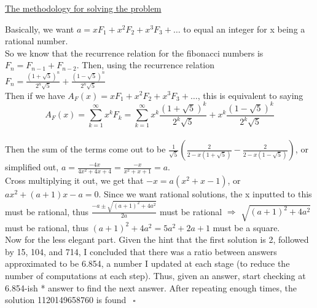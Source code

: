 \documentclass [12pt] {article}
\newcommand{\ud}{\underline}
\newcommand{\Rarr}{\Rightarrow}
\begin{document}
\ud{The methodology for solving the problem}

Basically, we want $a = xF_1+x^2F_2 + x^3F_3 + \dotso$ to equal an integer for x being a rational number. \\

So we know that the recurrence relation for the fibonacci numbers is $F_n = F_{n-1} + F_{n-2}$. Then, using the recurrence relation $F_n = \frac{ (1+\sqrt{5})^n}{2^n \sqrt{5}} + \frac{ (1-\sqrt{5})^n} {2^n \sqrt{5}}$ \\
 
Then if we have $A_F(x) = xF_1 + x^2F_2+ x^3F_3+\dotso$, this is equivalent to saying $$A_F(x) = \sum_{k=1}^{\infty} x^kF_k = \sum_{k=1}^{\infty} x^k  \frac{ (1+\sqrt{5})^k}{2^k \sqrt{5}} + x^k\frac{ (1-\sqrt{5})^k} {2^k \sqrt{5}}$$ \\
  
Then the sum of the terms come out to be $\frac 1 {\sqrt{5}} ( \frac {2}{2-x(1+\sqrt{5})} - \frac 2 {2-x(1-\sqrt{5})})$, or simplified out, $a = \frac{-4x}{4x^2+4x+4} = \frac {-x}{x^2+x+1} = a$. \\

Cross multiplying it out, we get that $-x = a(x^2+x-1)$, or $ax^2 +(a+1)x -a = 0$. Since we want rational solutions, the x inputted to this must be rational, thus $\frac {-a \pm \sqrt{(a+1)^2+4a^2}}{2a}$ must be rational $\Rarr$ $\sqrt{(a+1)^2 + 4a^2}$ must be rational, thus $(a+1)^2 + 4a^2 = 5a^2+2a+1$ must be a square. \\

Now for the less elegant part. Given the hint that the first solution is 2, followed by 15, 104, and 714, I concluded that there was a ratio between answers approximated to be 6.854, a number I updated at each stage (to reduce the number of computations at each step). Thus, given an answer, start checking at 6.854-ish * answer to find the next answer. After repeating enough times, the solution 1120149658760 is found $\ \ \square$
\end{document}
